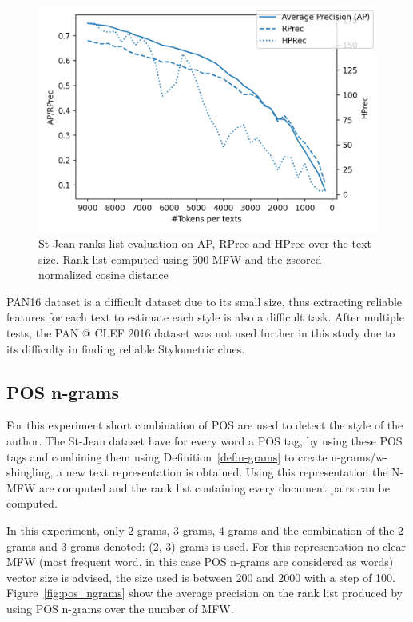 \begin{figure}
  \includegraphics[width=\linewidth]{img/degradation.png}
  \caption{St-Jean ranks list evaluation on AP, RPrec and HPrec over the text size. Rank list computed using 500 MFW and the zscored-normalized cosine distance}
  \label{img:degradation}
\end{figure}

PAN16 dataset is a difficult dataset due to its small size, thus extracting reliable features for each text to estimate each style is also a difficult task.
After multiple tests, the PAN @ CLEF 2016 dataset was not used further in this study due to its difficulty in finding reliable Stylometric clues.

\subsection{POS n-grams}

For this experiment short combination of POS are used to detect the style of the author.
The St-Jean dataset have for every word a POS tag, by using these POS tags and combining them using Definition~\ref{def:n-grams} to create n-grams/w-shingling, a new text representation is obtained.
Using this representation the N-MFW are computed and the rank list containing every document pairs can be computed.

In this experiment, only 2-grams, 3-grams, 4-grams and the combination of the 2-grams and 3-grams denoted: (2, 3)-grams is used.
For this representation no clear MFW (most frequent word, in this case POS n-grams are considered as words) vector size is advised, the size used is between 200 and 2000 with a step of 100.
Figure~\ref{fig:pos_ngrams} show the average precision on the rank list produced by using POS n-grams over the number of MFW.

